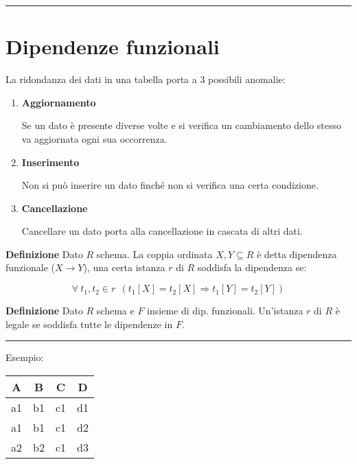 \documentclass{article}
\begin{document}
\noindent\rule{\textwidth}{0.5pt}

\section{Dipendenze funzionali}

La ridondanza dei dati in una tabella porta a 3 possibili anomalie:
\begin{enumerate}
    \item \textbf{Aggiornamento}

        Se un dato è presente diverse volte e si verifica un cambiamento dello stesso va aggiornata ogni sua occorrenza.

    \item \textbf{Inserimento}

        Non si può inserire un dato finché non si verifica una certa condizione.

    \item \textbf{Cancellazione}

        Cancellare un dato porta alla cancellazione in cascata di altri dati.\newline
    
\end{enumerate}

\noindent\textbf{Definizione} Dato $R$ schema. La coppia ordinata $X,Y\subseteq R$ è detta dipendenza funzionale ($X\rightarrow Y$), una certa istanza $r$ di $R$ soddisfa la dipendenza se:

$$\forall\ t_1,t_2\in r\ \ (t_1[X]=t_2[X]\Rightarrow t_1[Y]=t_2[Y])$$\newline

\noindent\textbf{Definizione} Dato $R$ schema e $F$ insieme di dip. funzionali. Un'istanza $r$ di $R$ è legale se soddisfa tutte le dipendenze in $F$.

\noindent\rule{\textwidth}{0.5pt}

\noindent Esempio:

\begin{table}[ht]
    \centering
    \begin{tabular}{c|c|c|c}
        A & B & C & D\\
         \hline
        a1 & b1 & c1 & d1\\
        a1 & b1 & c1 & d2\\
        a2 & b2 & c1 & d3\\
    \end{tabular}
\end{table}
\end{document}
